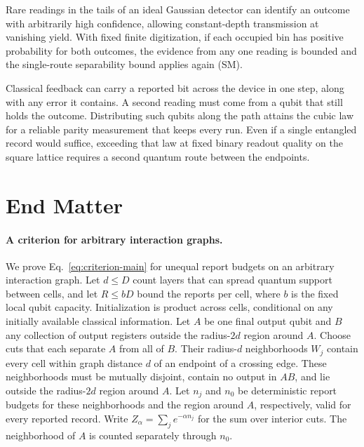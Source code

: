 \documentclass[aps,prl,twocolumn,superscriptaddress,longbibliography,reprint,floatfix]{revtex4-2}
\begin{document}
Rare readings in the tails of an ideal Gaussian detector can identify an outcome with arbitrarily high confidence, allowing constant-depth transmission at vanishing yield. With fixed finite digitization, if each occupied bin has positive probability for both outcomes, the evidence from any one reading is bounded and the single-route separability bound applies again (SM).

Classical feedback can carry a reported bit across the device in one step, along with any error it contains. A second reading must come from a qubit that still holds the outcome. Distributing such qubits along the path attains the cubic law for a reliable parity measurement that keeps every run. Even if a single entangled record would suffice, exceeding that law at fixed binary readout quality on the square lattice requires a second quantum route between the endpoints.






\onecolumngrid
\clearpage
\twocolumngrid
\section*{End Matter}
\paragraph*{A criterion for arbitrary interaction graphs.}
We prove Eq.~\eqref{eq:criterion-main} for unequal report budgets on an arbitrary interaction graph.
Let $d\le D$ count layers that can spread quantum support between cells,
and let $R\le bD$ bound the reports per cell, where $b$ is the fixed
local qubit capacity. Initialization is product across cells,
conditional on any initially available classical information.
Let $A$ be one final output qubit and $B$ any collection of output
registers outside the radius-$2d$ region around $A$.
Choose cuts that each separate $A$ from all of $B$. Their radius-$d$
neighborhoods $W_j$ contain every cell within graph distance
$d$ of an endpoint of a crossing edge. These neighborhoods must be
mutually disjoint, contain no output in $AB$, and lie outside the
radius-$2d$ region around $A$. Let $n_j$ and $n_0$ be deterministic
report budgets for these neighborhoods and the region around $A$,
respectively, valid for every reported record. Write
$Z_\alpha=\sum_j e^{-\alpha n_j}$ for the sum over interior cuts.
The neighborhood of $A$ is counted separately through $n_0$.
\end{document}
